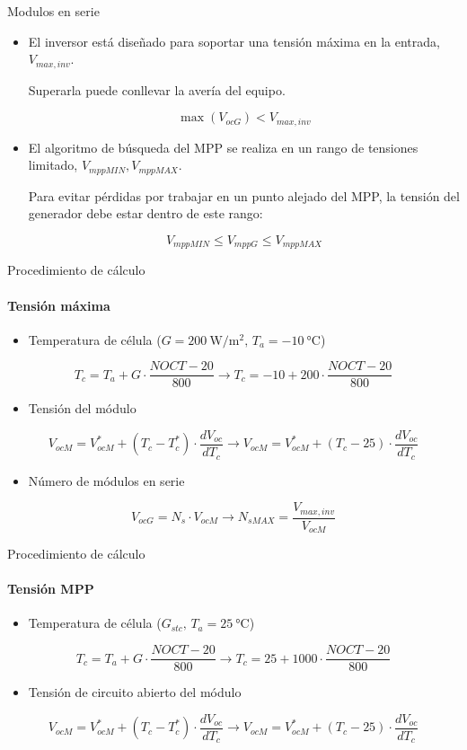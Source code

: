 \documentclass[aspectratio=169, usenames,svgnames,dvipsnames]{beamer}
\begin{document}
\begin{frame}[label={sec:orga76bd94}]{Modulos en serie}
\begin{itemize}
\item El inversor está diseñado para soportar una \alert{tensión máxima en la
entrada}, \(V_{max,inv}\).

Superarla puede conllevar la \alert{avería} del equipo.

\[
  \max(V_{ocG}) < V_{max,inv}
\]
\item El algoritmo de \alert{búsqueda del MPP} se realiza en un
rango de tensiones limitado, \(V_{mppMIN}, V_{mppMAX}\).

Para \alert{evitar pérdidas} por trabajar en un punto alejado del MPP, la tensión del generador debe estar dentro de este rango:

\[
  V_{mppMIN} \leq V_{mppG} \leq V_{mppMAX}
\]
\end{itemize}
\end{frame}
\begin{frame}[label={sec:org0847732}]{Procedimiento de cálculo}
\framesubtitle{Tensión máxima}

\begin{itemize}
\item Temperatura de célula (\(G=\qty{200}{\watt\per\meter\squared},\, T_{a}=\qty{-10}{\celsius}\))
\end{itemize}
\[
  T_{c} = T_{a} + G \cdot \frac{NOCT-20}{800} \rightarrow   T_{c} = -10 + 200 \cdot \frac{NOCT-20}{800}
\]

\begin{itemize}
\item Tensión del módulo
\end{itemize}
\[
  V_{ocM} = V_{ocM}^{*} + (T_{c}-T_{c}^{*})\cdot\frac{dV_{oc}}{dT_{c}} \rightarrow V_{ocM} = V_{ocM}^{*} + (T_{c}- 25)\cdot\frac{dV_{oc}}{dT_{c}}
\]
\begin{itemize}
\item Número de módulos en serie
\end{itemize}
\[
      V_{ocG} = N_s \cdot V_{ocM} \rightarrow N_{sMAX}=\frac{V_{max,inv}}{V_{ocM}}
\]
\end{frame}
\begin{frame}[label={sec:org400ef02}]{Procedimiento de cálculo}
\framesubtitle{Tensión MPP}
\begin{itemize}
\item Temperatura de célula (\(G_{stc},\, T_{a}=\qty{25}{\celsius}\))
\end{itemize}
\[
  T_{c} = T_{a} + G \cdot \frac{NOCT-20}{800} \rightarrow T_{c} = 25 + 1000 \cdot \frac{NOCT-20}{800}
\]
\begin{itemize}
\item Tensión de circuito abierto del módulo
\end{itemize}
\[
  V_{ocM} = V_{ocM}^{*} + (T_{c}-T_{c}^{*})\cdot\frac{dV_{oc}}{dT_{c}} \rightarrow
  V_{ocM} = V_{ocM}^{*} + (T_{c}- 25)\cdot\frac{dV_{oc}}{dT_{c}}
\]
\end{frame}
\end{document}
